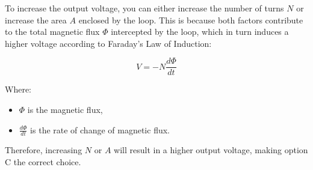To increase the output voltage, you can either increase the number of turns \( N \) or increase the area \( A \) enclosed by the loop. This is because both factors contribute to the total magnetic flux \( \Phi \) intercepted by the loop, which in turn induces a higher voltage according to Faraday's Law of Induction:

\[
V = -N \frac{d\Phi}{dt}
\]

Where:
\begin{itemize}
    \item \( \Phi \) is the magnetic flux,
    \item \( \frac{d\Phi}{dt} \) is the rate of change of magnetic flux.
\end{itemize}

Therefore, increasing \( N \) or \( A \) will result in a higher output voltage, making option C the correct choice.

